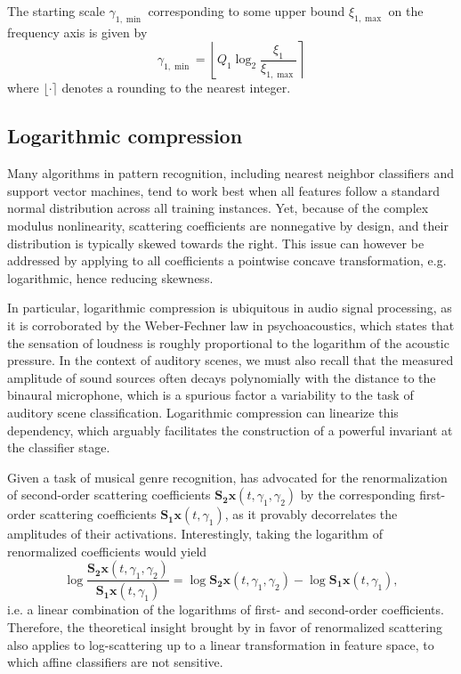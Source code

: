 \documentclass[journal]{IEEEtran}
\makeatletter
\newcommand*{\eg}{e.g.\@\xspace}
\newcommand*{\ie}{i.e.\@\xspace}
\makeatother
\begin{document}
The starting scale $\gamma_{1,\min}$ corresponding to some upper bound $\xi_{1,\max}$ on the frequency axis is given by
\begin{equation}
\gamma_{1,\min} =
\left\lfloor Q_1 \log_2 \frac{\xi_1}{\xi_{1,\max}} \right\rceil
\end{equation}
where $\lfloor \cdot \rceil$ denotes a rounding to the nearest integer.

\subsection{Logarithmic compression}
Many algorithms in pattern recognition, including nearest neighbor classifiers and support vector machines, tend to work best when all features follow a standard normal distribution across all training instances.
Yet, because of the complex modulus nonlinearity, scattering coefficients are nonnegative by design, and their distribution is typically skewed towards the right.
This issue can however be addressed by applying to all coefficients a pointwise concave transformation, \eg logarithmic, hence reducing skewness.

In particular, logarithmic compression is ubiquitous in audio signal processing, as it is corroborated by the Weber-Fechner law in psychoacoustics, which states that the sensation of loudness is roughly proportional to the logarithm of the acoustic pressure.
In the context of auditory scenes, we must also recall that the measured amplitude of sound sources often decays polynomially with the distance to the binaural microphone, which is a spurious factor a variability to the task of auditory scene classification.
Logarithmic compression can linearize this dependency, which arguably facilitates the construction of a powerful invariant at the classifier stage.

Given a task of musical genre recognition, \cite{Anden2014} has advocated for the renormalization of second-order scattering coefficients $\mathbf{S_2}\boldsymbol{x}(t,\gamma_1,\gamma_2)$ by the corresponding first-order scattering coefficients $\mathbf{S_1}\boldsymbol{x}(t,\gamma_1)$, as it provably decorrelates the amplitudes of their activations.
Interestingly, taking the logarithm of renormalized coefficients would yield
\begin{equation}
\log \dfrac{\mathbf{S_2}\boldsymbol{x}(t,\gamma_1,\gamma_2)}{\mathbf{S_1}\boldsymbol{x}(t,\gamma_1)} =
\log \mathbf{S_2}\boldsymbol{x}(t, \gamma_1, \gamma_2) -
\log \mathbf{S_1}\boldsymbol{x}(t, \gamma_1),
\end{equation}
\ie a linear combination of the logarithms of first- and second-order coefficients.
Therefore, the theoretical insight brought by \cite{Anden2014} in favor of renormalized scattering also applies to log-scattering up to a linear transformation in feature space, to which affine classifiers are not sensitive.
\end{document}
